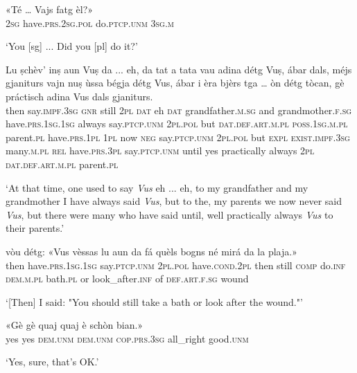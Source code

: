 \begin{linenumbers}
\gll «Té\footnotemark{} … Vajs fatg èl?»   \\
 \textsc{2sg} {} have.\textsc{prs.2sg.pol} do.\textsc{ptcp.unm} \textsc{3sg.m}\\
\end{linenumbers}
\medskip
\glt `You [sg] ... Did you [pl] do it?'
\medskip

\begin{linenumbers}
\gll  Lu ṣchèv’ inṣ aun Vuṣ da ... eh, da tat a tata vau adina détg Vuṣ, ábar dals, méjs gjaniturs vajn nuṣ ùssa bégja détg Vus, ábar i èra bjèrs tga … òn détg tòcan, gè práctisch adina Vus dals gjaniturs.  \\
then say.\textsc{impf.3sg} \textsc{gnr} still  \textsc{2pl} \textsc{dat} {} eh \textsc{dat} grandfather.\textsc{m.sg} and grandmother.\textsc{f.sg} have.\textsc{prs.1sg.1sg} always say.\textsc{ptcp.unm} \textsc{2pl.pol} but \textsc{dat.def.art.m.pl} \textsc{poss.1sg.m.pl} parent.\textsc{pl}  have.\textsc{prs.1pl} \textsc{1pl} now \textsc{neg} say.\textsc{ptcp.unm} \textsc{2pl.pol} but \textsc{expl} \textsc{exist.impf.3sg} many.\textsc{m.pl} \textsc{rel} {} have.\textsc{prs.3pl} say.\textsc{ptcp.unm} until yes practically always \textsc{2pl} \textsc{dat.def.art.m.pl} parent.\textsc{pl}\\
\end{linenumbers}
\medskip
\glt `At that time, one used to say \textit{Vus} eh ... eh, to my grandfather and my grandmother I have always said \textit{Vus}, but to the, my parents we now never said \textit{Vus}, but there were many who have said until, well practically always \textit{Vus} to their parents.'
\medskip

\begin{linenumbers}
\gll  [Lu] vòu détg:  «Vus vèssas lu aun da fá quèls bogns né mirá da la plaja.»  \\
then have.\textsc{prs.1sg.1sg} say.\textsc{ptcp.unm} \textsc{2pl.pol}  have.\textsc{cond.2pl} then still \textsc{comp} do.\textsc{inf} \textsc{dem.m.pl} bath.\textsc{pl} or look\_after.\textsc{inf} of \textsc{def.art.f.sg} wound\\
\end{linenumbers}
\medskip
\glt `[Then] I said: "You should still take a bath or look after the wound."'
\medskip

\begin{linenumbers}
\gll  «Gè gè quaj quaj è schòn bian.»  \\
yes yes \textsc{dem.unm} \textsc{dem.unm} \textsc{cop.prs.3sg} all\_right good.\textsc{unm}  \\
\end{linenumbers}
\medskip
\glt `Yes, sure, that’s OK.'
\medskip

